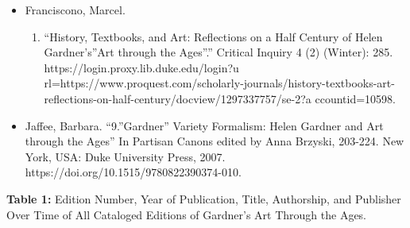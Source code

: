 \documentclass[
  letterpaper,
  DIV=11,
  numbers=noendperiod]{scrreprt}
\providecommand{\tightlist}{%
  \setlength{\itemsep}{0pt}\setlength{\parskip}{0pt}}
\begin{document}
\begin{itemize}
\tightlist
\item
  Franciscono, Marcel.

  \begin{enumerate}
  \def\labelenumi{\arabic{enumi}.}
  \setcounter{enumi}{1976}
  \tightlist
  \item
    ``History, Textbooks, and Art: Reflections on a Half Century of
    Helen Gardner's''Art through the Ages''.'' Critical Inquiry 4 (2)
    (Winter): 285. https://login.proxy.lib.duke.edu/login?u
    rl=https://www.proquest.com/scholarly-journals/history-textbooks-art-reflections-on-half-century/docview/1297337757/se-2?a
    ccountid=10598.
  \end{enumerate}
\item
  Jaffee, Barbara. ``9.''Gardner'' Variety Formalism: Helen Gardner and
  Art through the Ages'' In Partisan Canons edited by Anna Brzyski,
  203-224. New York, USA: Duke University Press, 2007.
  https://doi.org/10.1515/9780822390374-010.
\end{itemize}

\textbf{Table 1:} Edition Number, Year of Publication, Title,
Authorship, and Publisher Over Time of All Cataloged Editions of
Gardner's Art Through the Ages.
\end{document}
